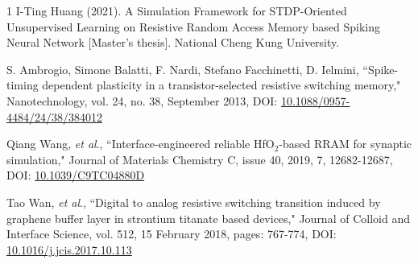 \documentclass[journal]{IEEEtran}
\begin{document}
\begin{thebibliography}{1}
I-Ting Huang (2021). A Simulation Framework for STDP-Oriented Unsupervised Learning on Resistive Random Access Memory based Spiking Neural Network [Master’s thesis]. National Cheng Kung University.


S. Ambrogio, Simone Balatti, F. Nardi, Stefano Facchinetti, D. Ielmini, ``Spike-timing dependent plasticity in a transistor-selected resistive switching memory," Nanotechnology, vol. 24, no. 38, September 2013, DOI: \href{https://iopscience.iop.org/article/10.1088/0957-4484/24/38/384012}{10.1088/0957-4484/24/38/384012}

Qiang Wang, \emph{et al}., ``Interface-engineered reliable HfO$_2$-based RRAM for synaptic simulation," Journal of Materials Chemistry C, issue 40, 2019, 7, 12682-12687, DOI: \href{DOI	https://DOI.org/10.1039/C9TC04880D}{10.1039/C9TC04880D}

Tao Wan, \emph{et al}., ``Digital to analog resistive switching transition induced by graphene buffer layer in strontium titanate based devices," Journal of Colloid and Interface Science, vol. 512, 15 February 2018, pages: 767-774, DOI: \href{https://DOI.org/10.1016/j.jcis.2017.10.113}{10.1016/j.jcis.2017.10.113}












\end{thebibliography}



\end{document}
